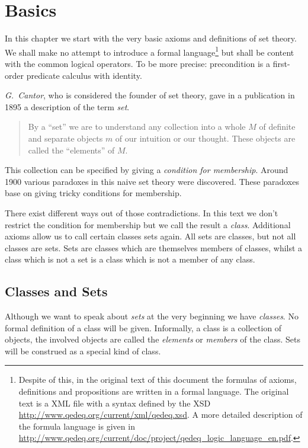\documentclass[a4paper,german,10pt,twoside]{book}
\theoremstyle{definition}
\theoremstyle{remark}
\begin{document}

\chapter{Basics} \label{chapter3} \hypertarget{chapter3}{}

In this chapter we start with the very basic axioms and definitions of set theory. We shall make no attempt to introduce a formal language\footnote{Despite of this, in the original text of this document the formulas of axioms, definitions and propositions are written in a formal language. The original text is a XML file with a syntax defined by the XSD \url{http://www.qedeq.org/current/xml/qedeq.xsd}. A more detailed description of the formula language is given in \url{http://www.qedeq.org/current/doc/project/qedeq_logic_language_en.pdf}.} but shall be content with the common logical operators. To be more precise: precondition is a first-order predicate calculus with identity.

\par{}
\emph{G.~Cantor}, who is considered the founder of set theory, gave in a publication in 1895 a description of the term \emph{set}.

\begin{quote}
 By a ``set'' we are to understand any collection into a whole $M$ of definite and separate objects $m$ of our intuition or our thought. These objects are called the ``elements'' of $M$.
\end{quote}

\par
This collection can be specified by giving a \emph{condition for membership}. Around 1900 various paradoxes in this naive set theory were discovered. These paradoxes base on giving tricky conditions for membership.

\par
There exist different ways out of those contradictions. In this text we don't restrict the condition for membership but we call the result a \emph{class}. Additional axioms allow us to call certain classes sets again. All sets are classes, but not all classes are sets. Sets are classes which are themselves members of classes, whilst a class which is not a set is a class which is not a member of any class.

\section{Classes and Sets} \label{chapter3_section1} \hypertarget{chapter3_section1}{}
Although we want to speak about \emph{sets} at the very beginning we have \emph{classes}. No formal definition of a class will be given. Informally, a class is a collection of objects, the involved objects are called the \emph{elements} or \emph{members} of the class. 
Sets will be construed as a special kind of class.
\end{document}
